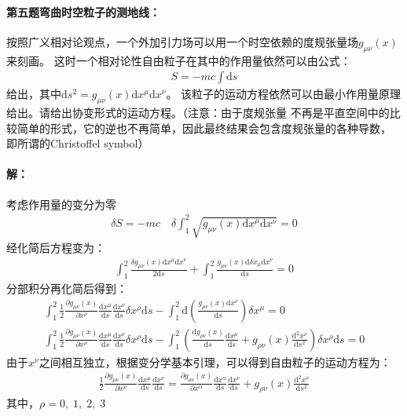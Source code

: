 \documentclass[a4paper]{ctexart}
\def\d{\mathrm{d}}
\begin{document}
    \paragraph{第五题\;弯曲时空粒子的测地线：}
    按照广义相对论观点，一个外加引力场可以用一个时空依赖的度规张量场$g_{\mu\nu}(x)$来刻画。
    这时一个相对论性自由粒子在其中的作用量依然可以由公式：
    \begin{align}
        S = -mc\int\d s
    \end{align}
    给出，其中$\d s^{2} = g_{\mu\nu}(x)\d x^{\mu}\d x^{\nu}$。
    该粒子的运动方程依然可以由最小作用量原理给出。请给出协变形式的运动方程。（注意：由于度规张量
    不再是平直空间中的比较简单的形式，它的逆也不再简单，因此最终结果会包含度规张量的各种导数，
    即所谓的Christoffel symbol）
    \paragraph{解：}
    考虑作用量的变分为零
    \begin{align}
        \delta S = -mc\quad\delta\int_{1}^{2} \sqrt{g_{\mu\nu}(x)\d x^{\mu}\d x^{\nu}} = 0
    \end{align}
    经化简后方程变为：
    \begin{align}
        \int_{1}^{2}\frac{\delta g_{\mu\nu}(x)\d x^{\mu}\d x^{\nu}}{2\d s}
         + \int_{1}^{2}\frac{g_{\mu\nu}(x)\d \delta x_{\mu}\d x^{\nu}}{\d s} = 0
    \end{align}
    分部积分再化简后得到：
    \begin{align}
        \int_{1}^{2}\frac{1}{2}\frac{\partial g_{\mu\nu}(x)}{\partial x^{\rho}}\frac{\d x^{\mu}}{\d s}\frac{\d x^{\nu}}{\d s}\delta x^{\rho}\d s
         - \int_{1}^{2}\d\left(\frac{g_{\mu\nu}(x)\d x^{\nu}}{\d s}\right)\delta x^{\mu} = 0\\
        \int_{1}^{2}\frac{1}{2}\frac{\partial g_{\mu\nu}(x)}{\partial x^{\rho}}\frac{\d x^{\mu}}{\d s}\frac{\d x^{\nu}}{\d s}\delta x^{\rho}\d s
         - \int_{1}^{2}\left(\frac{\d g_{\rho\nu}(x)}{\d s}\frac{\d x^{\mu}}{\d s} + g_{\rho\nu}(x)\frac{\d^{2}x^{\nu}}{\d s^{2}}\right)\delta x^{\rho}\d s = 0
    \end{align}
    由于$x^{\nu}$之间相互独立，根据变分学基本引理，可以得到自由粒子的运动方程为：
    \begin{align}
        \frac{1}{2}\frac{\partial g_{\mu\nu}(x)}{\partial x^{\rho}}\frac{\d x^{\mu}}{\d s}\frac{\d x^{\nu}}{\d s} = 
        \frac{\partial g_{\rho\nu}(x)}{\partial x^{\alpha}}\frac{\d x^{\alpha}}{\d s}\frac{\d x^{\nu}}{\d s} + g_{\rho\nu}(x)\frac{\d^{2}x^{\nu}}{\d s^{2}}
    \end{align}
    其中，$\rho = 0,\;1,\;2,\;3$
\end{document}
